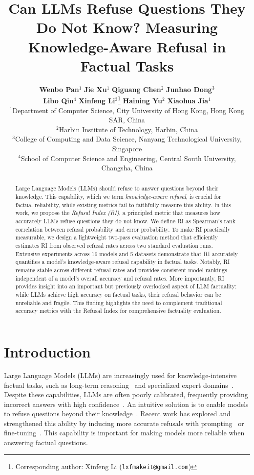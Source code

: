 \documentclass{article} %
\title{Can LLMs Refuse Questions They Do Not Know? Measuring Knowledge-Aware Refusal in Factual Tasks}
\author{%
\textbf{Wenbo Pan}$^{1}$ \quad \textbf{Jie Xu}$^{1}$ \quad \textbf{Qiguang Chen}$^{2}$ \quad \textbf{Junhao Dong}$^{3}$ \\
\textbf{Libo Qin}$^{4}$ \quad \textbf{Xinfeng Li}$^{3}$\thanks{Corresponding author: Xinfeng Li (\texttt{lxfmakeit@gmail.com})} \quad \textbf{Haining Yu}$^{2}$ \quad \textbf{Xiaohua Jia}$^{1}$ \\
$^{1}$Department of Computer Science, City University of Hong Kong, Hong Kong SAR, China \\
$^{2}$Harbin Institute of Technology, Harbin, China \\
$^{3}$College of Computing and Data Science, Nanyang Technological University, Singapore \\
$^{4}$School of Computer Science and Engineering, Central South University, Changsha, China
}
\theoremstyle{definition}
\begin{document}
\maketitle

\begin{abstract}
Large Language Models (LLMs) should refuse to answer questions beyond their knowledge.
This capability, which we term \emph{knowledge-aware refusal}, is crucial for factual reliability, while existing metrics fail to faithfully measure this ability.
In this work, we propose the \emph{Refusal Index (RI)}, a principled metric that measures how accurately LLMs refuse questions they do not know.
We define RI as Spearman's rank correlation between refusal probability and error probability.
To make RI practically measurable, we design a lightweight two-pass evaluation method that efficiently estimates RI from observed refusal rates across two standard evaluation runs.
Extensive experiments across 16 models and 5 datasets demonstrate that RI accurately quantifies a model's knowledge-aware refusal capability in factual tasks.
Notably, RI remains stable across different refusal rates and provides consistent model rankings independent of a model's overall accuracy and refusal rates.
More importantly, RI provides insight into an important but previously overlooked aspect of LLM factuality: while LLMs achieve high accuracy on factual tasks, their refusal behavior can be unreliable and fragile.
This finding highlights the need to complement traditional accuracy metrics with the Refusal Index for comprehensive factuality evaluation.

\end{abstract}

\vspace{-0.7em}
\section{Introduction}
\vspace{-0.7em}
\label{sec:intro}

Large Language Models (LLMs) are increasingly used for knowledge-intensive factual tasks, such as long-term reasoning~\citep{chen2025reasoningerasurveylong} and specialized expert domains~\citep{wang2025capabilitiesgpt5multimodalmedical,gu2024legalagentbench,mahdavi2025brains}. 
Despite these capabilities, LLMs are often poorly calibrated, frequently providing incorrect answers with high confidence~\citep{Huang_2025}. 
An intuitive solution is to enable models to refuse questions beyond their knowledge~\citep{yin2023large}. 
Recent work has explored and strengthened this ability by inducing more accurate refusals with prompting~\citep{cheng2024aiassistantsknowdont, kadavathLanguageModelsMostly2022} or fine-tuning~\citep{zhang2024rtuninginstructinglargelanguage, kapoor2024large}. 
This capability is important for making models more reliable when answering factual questions.
\end{document}
